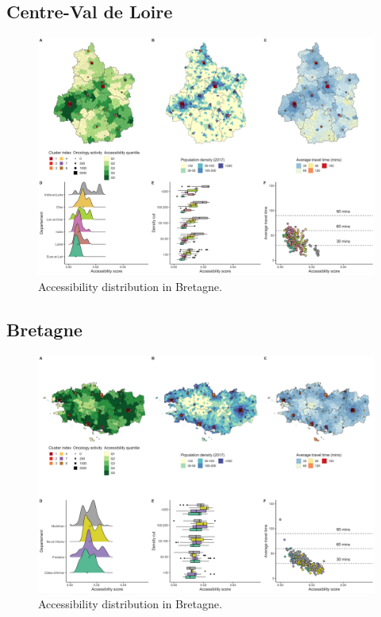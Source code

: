 \subsection{Centre-Val de Loire}

\begin{figure}[h]
    \includegraphics[width=\textwidth]{images/camion/region_accessibility/accessibility_Centre-Val-de-Loire.png}
    \centering
    \caption{
        Accessibility distribution in Bretagne.
    }
\end{figure}

\subsection{Bretagne}

\begin{figure}[h]
    \includegraphics[width=\textwidth]{images/camion/region_accessibility/accessibility_Bretagne.png}
    \centering
    \caption{
        Accessibility distribution in Bretagne.
    }
\end{figure}

